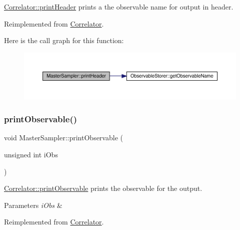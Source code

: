 \mbox{\hyperlink{class_correlator_ac7c5a07d7cbee97c417a1659b93083b2}{Correlator\+::print\+Header}} prints a the observable name for output in header. 



Reimplemented from \mbox{\hyperlink{class_correlator_ac7c5a07d7cbee97c417a1659b93083b2}{Correlator}}.

Here is the call graph for this function\+:\nopagebreak
\begin{figure}[H]
\begin{center}
\leavevmode
\includegraphics[width=350pt]{class_master_sampler_a51b207672764c100e1ae258fd2e33fcf_cgraph}
\end{center}
\end{figure}
\mbox{\label{class_master_sampler_a41853c3e4ab52fca7d93cf80e8702b7a}} 
\subsubsection{\texorpdfstring{printObservable()}{printObservable()}}
{\footnotesize\ttfamily void Master\+Sampler\+::print\+Observable (\begin{DoxyParamCaption}\item[{unsigned int}]{i\+Obs }\end{DoxyParamCaption})\hspace{0.3cm}{\ttfamily [virtual]}}



\mbox{\hyperlink{class_correlator_a15744ddb9f2b71fff34ac762d101df38}{Correlator\+::print\+Observable}} prints the observable for the output. 


\begin{DoxyParams}{Parameters}
{\em i\+Obs} & \\
\hline
\end{DoxyParams}


Reimplemented from \mbox{\hyperlink{class_correlator_a15744ddb9f2b71fff34ac762d101df38}{Correlator}}.

